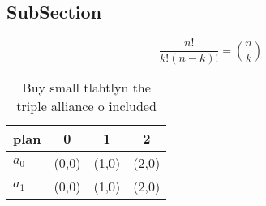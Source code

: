 \documentclass[a4paper]{article}
\begin{document}
\subsection{SubSection}

\[ \frac{n!}{k!(n-k)!} = \binom{n}{k} \]

\begin{table}
\begin{adjustbox}{width=0.6\columnwidth}
\begin{tabular}{|l|l|l|l|}
\hline
\textbf{plan} & \multicolumn{1}{c|}{\textbf{0}} & \multicolumn{1}{c|}{\textbf{1}} & \multicolumn{1}{c|}{\textbf{2}} \\ \hline
\textbf{$a_0$}  & (0,0) & (1,0) & (2,0) \\ \hline
\textbf{$a_1$}  & (0,0) & (1,0) & (2,0) \\ \hline
\end{tabular}
\end{adjustbox}
\caption{Buy small tlahtlyn the triple alliance o included
}
\end{table}
\end{document}
